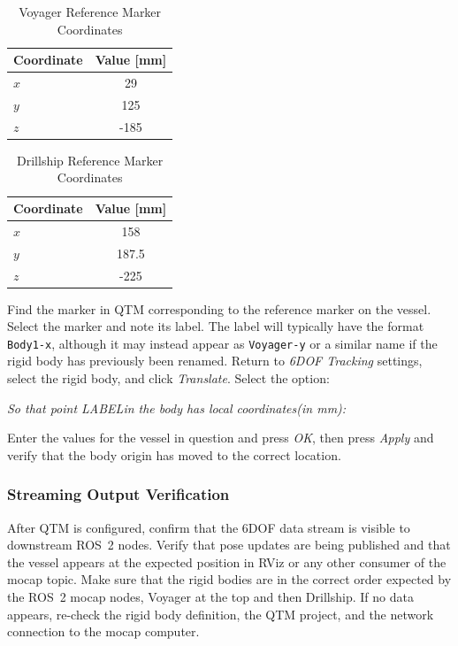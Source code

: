 \documentclass[12pt,a4paper]{article}
\begin{document}
	\begin{table}[h]
		\centering
		\caption{Voyager Reference Marker Coordinates}
		\label{tab:voyager_ref_marker}
		\begin{tabular}{l c}
			\hline
			Coordinate & Value [mm] \\
			\hline
			$x$ & 29 \\
			$y$ & 125 \\
			$z$ & -185 \\
			\hline
		\end{tabular}
	\end{table}
	
	\begin{table}[h]
		\centering
		\caption{Drillship Reference Marker Coordinates}
		\label{tab:drillship_ref_marker}
		\begin{tabular}{l c}
			\hline
			Coordinate & Value [mm] \\
			\hline
			$x$ & 158 \\
			$y$ & 187.5 \\
			$z$ & -225 \\
			\hline
		\end{tabular}
	\end{table}
	
	Find the marker in QTM corresponding to the reference marker on the vessel. Select the marker and note its label. The label will typically have the format \texttt{Body1-x}, although it may instead appear as \texttt{Voyager-y} or a similar name if the rigid body has previously been renamed. Return to \emph{6DOF Tracking} settings, select the rigid body, and click \emph{Translate}. Select the option: 
	
	\begin{center}
		\emph{So that point \textlangle LABEL\textrangle in the body has local coordinates(in mm):}
	\end{center}
	Enter the values for the vessel in question and press \emph{OK}, then press \emph{Apply} and verify that the body origin has moved to the correct location. 
	\subsubsection{Streaming Output Verification}
	
	After QTM is configured, confirm that the 6DOF data stream is visible to downstream ROS~2 nodes. Verify that pose updates are being published and that the vessel appears at the expected position in RViz or any other consumer of the mocap topic. Make sure that the rigid bodies are in the correct order expected by the ROS~2 mocap nodes, Voyager at the top and then Drillship.  If no data appears, re-check the rigid body definition, the QTM project, and the network connection to the mocap computer.
	
\end{document}

